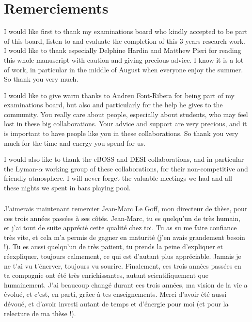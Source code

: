 % 


% 


\chapter*{Remerciements}
\thispagestyle{plain}


I would like first to thank my examinations board who kindly accepted to be part of this board, listen to and evaluate the completion of this 3 years research work.
I would like to thank especially Delphine Hardin and Matthew Pieri for reading this whole manuscript with caution and giving precious advice. I know it is a lot of work, in particular in the middle of August when everyone enjoy the summer. So thank you very much.

I would like to give warm thanks to Andreu Font-Ribera for being part of my examinations board, but also and particularly for the help he gives to the community. You really care about people, especially about students, who may feel lost in these big collaborations. Your advice and support are very precious, and it is important to have people like you in these collaborations. So thank you very much for the time and energy you spend for us.

I would also like to thank the eBOSS and DESI collaborations, and in particular the Lyman-$\alpha$ working group of these collaborations, for their non-competitive and friendly atmosphere. I will never forget the valuable meetings we had and all these nights we spent in bars playing pool.

\paragraph{}
J'aimerais maintenant remercier Jean-Marc Le Goff, mon directeur de thèse, pour ces trois années passées à ses côtés. Jean-Marc, tu es quelqu'un de très humain, et j'ai tout de suite apprécié cette qualité chez toi. Tu as su me faire confiance très vite, et cela m'a permis de gagner en maturité (j'en avais grandement besoin !). Tu es aussi quelqu'un de très patient, tu prends la peine d'expliquer et réexpliquer, toujours calmement, ce qui est d'autant plus appréciable. Jamais je ne t'ai vu t'énerver, toujours vu sourire. Finalement, ces trois années passées en ta compagnie ont été très enrichissantes, autant scientifiquement que humainement. J'ai beaucoup changé durant ces trois années, ma vision de la vie a évolué, et c'est, en parti, grâce à tes enseignements. Merci d'avoir été aussi dévoué, et d'avoir investi autant de temps et d'énergie pour moi (et pour la relecture de ma thèse !).

